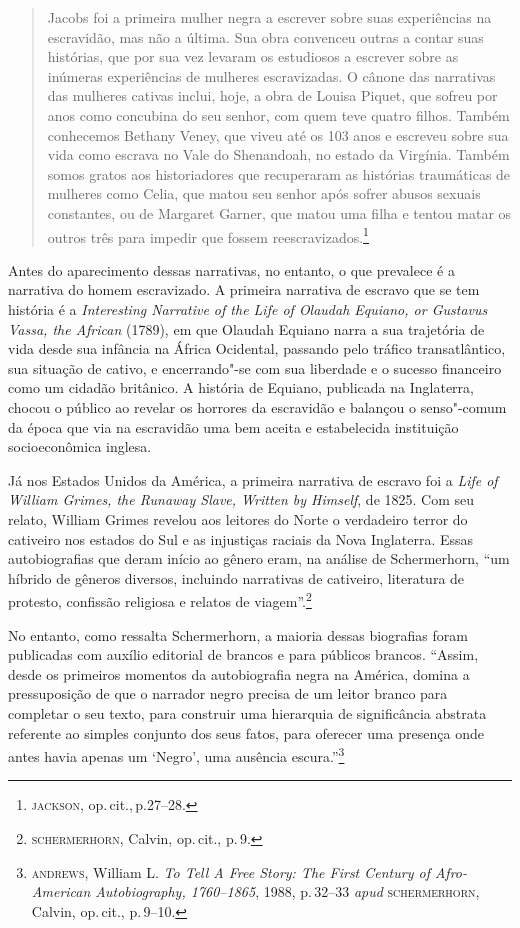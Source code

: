 \begin{quote}
Jacobs foi a primeira mulher negra a escrever sobre suas
experiências na escravidão, mas não a última. Sua obra convenceu outras a contar suas
histórias, que por sua vez levaram os estudiosos a escrever sobre as
inúmeras experiências de mulheres escravizadas. O cânone das narrativas
das mulheres cativas inclui, hoje, a obra de Louisa Piquet, que
sofreu por anos como concubina do seu senhor, com quem teve quatro
filhos. Também conhecemos Bethany Veney, que viveu até os 103 anos e
escreveu sobre sua vida como escrava no Vale do Shenandoah, no estado da
Virgínia. Também somos gratos aos historiadores que recuperaram as
histórias traumáticas de mulheres como Celia, que matou seu senhor após
sofrer abusos sexuais constantes, ou de Margaret Garner, que matou uma
filha e tentou matar os outros três para impedir que fossem
reescravizados.\footnote{\textsc{jackson}, op.\,cit.,\,p.27--28.}
\end{quote}

Antes do aparecimento dessas narrativas, no entanto, o que prevalece é a narrativa do homem escravizado.
A primeira narrativa de escravo que se tem história é a 
\textit{Interesting Narrative of the Life of Olaudah Equiano, or Gustavus Vassa, the African}
(1789), em que Olaudah Equiano narra a sua trajetória de vida desde sua infância na África Ocidental, passando pelo tráfico transatlântico, sua situação de cativo, e encerrando"-se com sua liberdade e o sucesso financeiro como um cidadão britânico.
A história de Equiano, publicada na Inglaterra, chocou o público ao revelar os horrores da escravidão e balançou o senso"-comum da época que via na escravidão uma bem aceita e estabelecida instituição socioeconômica inglesa.

Já nos Estados Unidos da América, a primeira narrativa de escravo foi a \emph{Life of William Grimes, the Runaway Slave, Written by Himself}, de 1825.
Com seu relato, William Grimes revelou aos leitores do Norte o verdadeiro terror do cativeiro nos estados do Sul e as injustiças raciais da Nova Inglaterra.
Essas autobiografias que deram início ao gênero eram, na análise de Schermerhorn, 
``um híbrido de gêneros diversos, incluindo narrativas de cativeiro, literatura de protesto, confissão religiosa e relatos de viagem''.\footnote{\textsc{schermerhorn}, Calvin, op.\,cit., p.\,9.}

No entanto, como ressalta Schermerhorn, a maioria dessas biografias foram publicadas com auxílio editorial de brancos e para públicos brancos.  “Assim, desde os primeiros momentos da autobiografia negra na América, domina a pressuposição de que o narrador negro precisa de um leitor branco para completar o seu texto, para construir uma
hierarquia de significância abstrata referente ao simples
conjunto dos seus fatos, para oferecer uma presença onde
antes havia apenas um `Negro', uma ausência escura.”\footnote{\textsc{andrews}, William L. \textit{To Tell A Free Story: The First Century of Afro-American Autobiography, 1760–1865}, 1988, p.\,32--33 \textit{apud} \textsc{schermerhorn}, Calvin, op.\,cit., p.\,9--10.}

